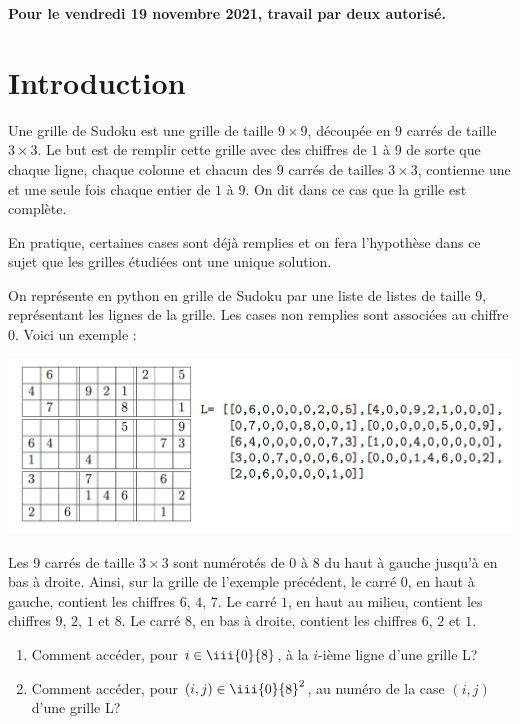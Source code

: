 \documentclass[a4paper,french,11pt,twoside]{VcCours}
\begin{document}
\begin{center}
\large\bf 
Pour le vendredi 19 novembre 2021, travail par deux autorisé.
\end{center}
\separationTitre


\section*{Introduction}
Une grille de Sudoku est une grille de taille $9 \times 9$, découpée en $9$ carrés de taille $3 \times 3$. Le but est de remplir cette grille avec des chiffres de $1$ à $9$ de sorte que chaque ligne, chaque colonne et chacun des $9$ carrés de tailles $3 \times 3$, contienne une et une seule fois chaque entier de $1$ à $9$. On dit dans ce cas que la grille est complète.

\medskip
En pratique, certaines cases sont déjà remplies et on fera l'hypothèse dans ce sujet que les grilles étudiées ont une unique solution.

\medskip
On représente en python en grille de Sudoku par une liste de listes de taille $9$, représentant les lignes de la grille. Les cases non remplies sont associées au chiffre $0$. Voici un exemple :

\begin{center}
\includegraphics[scale=0.5]{Sud1}
\end{center}


Les 9 carrés de taille $3 \times 3$ sont numérotés de $0$ à $8$ du haut à gauche jusqu'à en bas à droite. Ainsi, sur la grille de l'exemple précédent, le carré $0$, en haut à gauche, contient les chiffres $6$, $4$, $7$. Le carré $1$, en haut au milieu, contient les chiffres $9$, $2$, $1$ et $8$. Le carré $8$, en bas à droite, contient les chiffres $6$, $2$ et $1$.
\begin{enumerate}
\item Comment accéder, pour $i \in \iii{0}{8}$, à la $i$-ième ligne d'une grille L?
\item Comment accéder, pour $(i,j) \in \iii{0}{8}^2$, au numéro de la case $(i,j)$ d'une grille L?
\end{enumerate}
\end{document}
